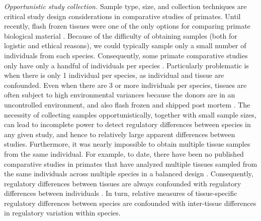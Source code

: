 \textit{Opportunistic study collection.} Sample type, size, and collection techniques are critical study design considerations in comparative studies of primates. Until recently, flash frozen tissues were one of the only options for comparing primate biological material \cite{RN1396}. Because of the difficulty of obtaining samples (both for logistic and ethical reasons), we could typically sample only a small number of individuals from each species. Consequently, some primate comparative studies only have only a handful of individuals per species \cite{RN2106, RN2111, RN2091}. Particularly problematic is when there is only 1 individual per species, as individual and tissue are confounded. 
Even when there are 3 or more individuals per species, tissues are often subject to high environmental variances because the donors are in an uncontrolled environment, and also flash frozen and shipped post mortem \cite{RN1342}. The necessity of collecting samples opportunistically, together with small sample sizes, can lead to incomplete power to detect regulatory differences between species in any given study, and hence to relatively large apparent differences between studies.
 Furthermore, it was nearly impossible to obtain multiple tissue samples from the same individual. For example, to date, there have been no published comparative studies in primates that have analyzed multiple tissues sampled from the same individuals across multiple species in a balanced design \cite{RN1342}. Consequently, regulatory differences between tissues are always confounded with regulatory differences between individuals \cite{RN2091}. In turn, relative measures of tissue-specific regulatory differences between species are confounded with inter-tissue differences in regulatory variation within species. 	

